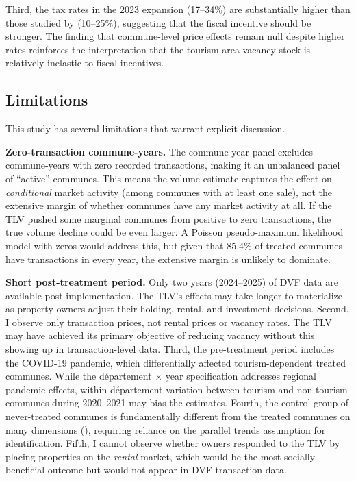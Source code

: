 \documentclass[12pt]{article}
\begin{document}
{Third, the tax rates in the 2023 expansion (17--34\%) are substantially higher than those studied by \citeauthor{gravel2019} (10--25\%), suggesting that the fiscal incentive should be stronger. The finding that commune-level price effects remain null despite higher rates reinforces the interpretation that the tourism-area vacancy stock is relatively inelastic to fiscal incentives.

\subsection{Limitations}

This study has several limitations that warrant explicit discussion.

\textbf{Zero-transaction commune-years.} The commune-year panel excludes commune-years with zero recorded transactions, making it an unbalanced panel of ``active'' communes. This means the volume estimate captures the effect on \textit{conditional} market activity (among communes with at least one sale), not the extensive margin of whether communes have any market activity at all. If the TLV pushed some marginal communes from positive to zero transactions, the true volume decline could be even larger. A Poisson pseudo-maximum likelihood model with zeros would address this, but given that 85.4\% of treated communes have transactions in every year, the extensive margin is unlikely to dominate.

\textbf{Short post-treatment period.} Only two years (2024--2025) of DVF data are available post-implementation. The TLV's effects may take longer to materialize as property owners adjust their holding, rental, and investment decisions. Second, I observe only transaction prices, not rental prices or vacancy rates. The TLV may have achieved its primary objective of reducing vacancy without this showing up in transaction-level data. Third, the pre-treatment period includes the COVID-19 pandemic, which differentially affected tourism-dependent treated communes. While the d\'epartement $\times$ year specification addresses regional pandemic effects, within-d\'epartement variation between tourism and non-tourism communes during 2020--2021 may bias the estimates. Fourth, the control group of never-treated communes is fundamentally different from the treated communes on many dimensions (), requiring reliance on the parallel trends assumption for identification. Fifth, I cannot observe whether owners responded to the TLV by placing properties on the \textit{rental} market, which would be the most socially beneficial outcome but would not appear in DVF transaction data.


}
\end{document}
